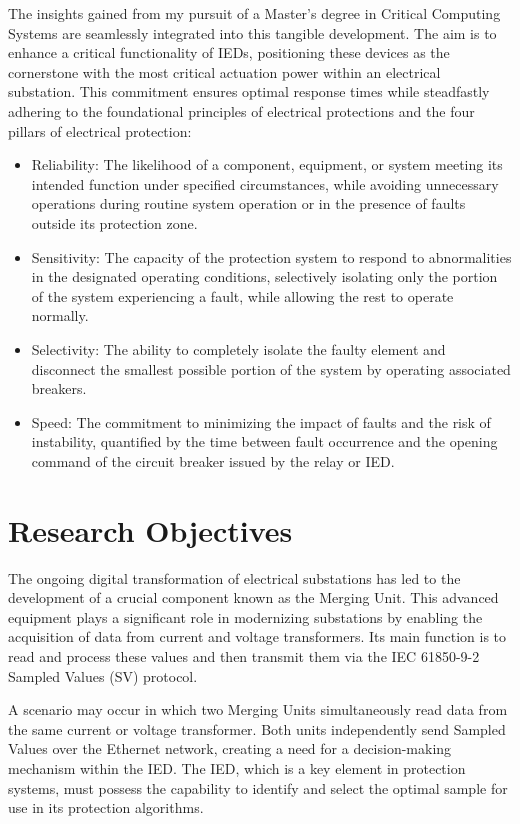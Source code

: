 The insights gained from my pursuit of a Master's degree in Critical Computing Systems are seamlessly integrated into this tangible development. The aim is to enhance a critical functionality of IEDs, positioning these devices as the cornerstone with the most critical actuation power within an electrical substation. This commitment ensures optimal response times while steadfastly adhering to the foundational principles of electrical protections and the four pillars of electrical protection:

\begin{itemize}
	\item Reliability: The likelihood of a component, equipment, or system meeting its intended function under specified circumstances, while avoiding unnecessary operations during routine system operation or in the presence of faults outside its protection zone.
	\item Sensitivity: The capacity of the protection system to respond to abnormalities in the designated operating conditions, selectively isolating only the portion of the system experiencing a fault, while allowing the rest to operate normally.
	\item Selectivity: The ability to completely isolate the faulty element and disconnect the smallest possible portion of the system by operating associated breakers.
	\item Speed: The commitment to minimizing the impact of faults and the risk of instability, quantified by the time between fault occurrence and the opening command of the circuit breaker issued by the relay or IED.
\end{itemize}

\section{Research Objectives}

The ongoing digital transformation of electrical substations has led to the development of a crucial component known as the Merging Unit. This advanced equipment plays a significant role in modernizing substations by enabling the acquisition of data from current and voltage transformers. Its main function is to read and process these values and then transmit them via the IEC 61850-9-2 Sampled Values (SV) protocol.

A scenario may occur in which two Merging Units simultaneously read data from the same current or voltage transformer. Both units independently send Sampled Values over the Ethernet network, creating a need for a decision-making mechanism within the IED. The IED, which is a key element in protection systems, must possess the capability to identify and select the optimal sample for use in its protection algorithms.

